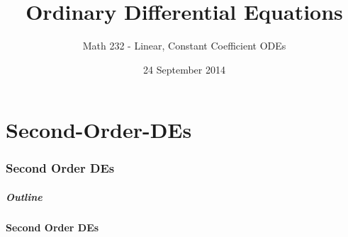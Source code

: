 \part{Second-Order-DEs}
\section{Second Order DEs}

\title{Ordinary Differential Equations}
\subtitle{Math 232 - Linear, Constant Coefficient ODEs}
\date{24 September 2014}

\begin{frame}
  \titlepage
\end{frame}

\begin{frame}
  \frametitle{Outline}
  \tableofcontents[currentsection ]
\end{frame}


\subsection{Second Order DEs}


